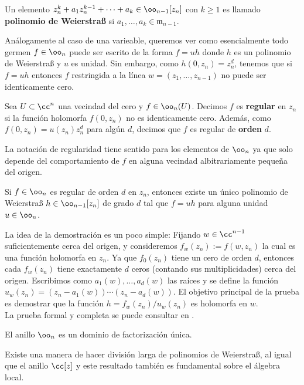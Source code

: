 	\begin{definition}
		Un elemento $z_n^k+a_1z_n^{k-1}+\cdots+a_k\in\oo_{n-1}[z_n]$ con $k\geq 1$ es llamado \textbf{polinomio de Weierstraß} si $a_1,\dots,a_k\in \mathfrak{m}_{n-1}$.
	\end{definition}
		Análogamente al caso de una varieable, queremos ver como esencialmente todo germen $f\in\oo_n$ puede ser escrito de la forma $f=uh$ donde $h$ es un polinomio de Weierstraß y $u$ es unidad. Sin embargo, como $h(0,z_n)=z_n^d$, tenemos que si $f=uh$ entonces $f$ restringida a la línea $w=(z_1,\dots,z_{n-1})$ no puede ser identicamente cero.  
	\begin{definition}
		Sea $U\subset\cc^n$ una vecindad del cero y $f\in\oo_n(U)$. Decimos $f$ es \textbf{regular} en $z_n$ si la función holomorfa $f(0,z_n)$ no es identicamente cero. Además, como $f(0,z_n)=u(z_n)z_n^d$ para algún $d$, decimos que $f$ es regular de \textbf{orden} $d$.
	\end{definition}
		La notación de regularidad tiene sentido para los elementos de $\oo_n$ ya que solo depende del comportamiento de $f$ en alguna vecindad albitrariamente pequeña del origen.
		
	\begin{theorem}
		Si $f\in\oo_n$ es regular de orden $d$ en $z_n$, entonces existe un único polinomio de Weierstraß $h\in\oo_{n-1}[z_n]$ de grado $d$ tal que $f=uh$ para alguna unidad $u\in\oo_n$.
	\end{theorem}
		La idea de la demostración es un poco simple: Fijando $w\in\cc^{n-1}$ suficientemente cerca del origen, y consideremos $f_w(z_n):=f(w,z_n)$ la cual es una función holomorfa en $z_n$. Ya que $f_0(z_n)$ tiene un cero de orden $d$, entonces cada $f_w(z_n)$ tiene exactamente $d$ ceros (contando sus multiplicidades) cerca del origen. Escribimos como $a_1(w),\dots,a_d(w)$ las raíces y se define la función $u_w(z_n)=(z_n-a_1(w))\cdots(z_n-a_d(w))$. El objetivo principal de la prueba es demostrar que la función $h=f_w(z_n)/u_w(z_n)$ es holomorfa en $w$.\\
		La prueba formal y completa se puede consultar en \parencite[Cap. 1, Sec, 1.1, Prop. 1.1.6]{huybrechts2005complex}.
		
	\begin{propo}\label{anillodfu}
		El anillo $\oo_{n}$ es un dominio de factorización única.
	\end{propo}
	
	Existe una manera de hacer división larga de polinomios de Weierstraß, al igual que el anillo $\cc[z]$ y este resultado también es fundamental sobre el álgebra local.
	
